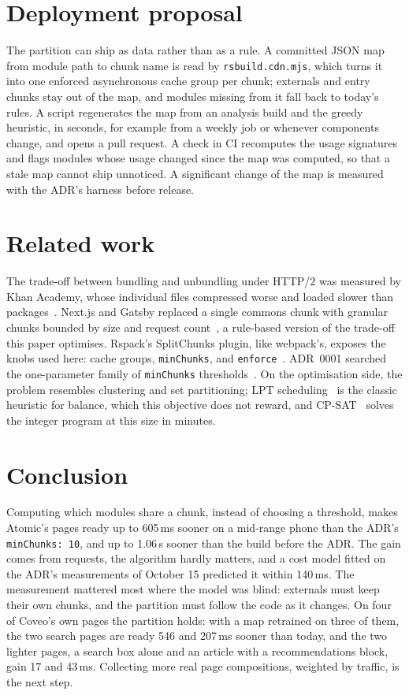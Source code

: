 \documentclass[11pt]{article}
\newcommand{\code}[1]{\texttt{#1}}
\begin{document}
\section{Deployment proposal}\label{sec:deploy}
The partition can ship as data rather than as a rule. A committed JSON map from module path to chunk name is read by \code{rsbuild.cdn.mjs}, which turns it into one enforced asynchronous cache group per chunk; externals and entry chunks stay out of the map, and modules missing from it fall back to today's rules. A script regenerates the map from an analysis build and the greedy heuristic, in seconds, for example from a weekly job or whenever components change, and opens a pull request. A check in CI recomputes the usage signatures and flags modules whose usage changed since the map was computed, so that a stale map cannot ship unnoticed. A significant change of the map is measured with the ADR's harness before release.

\section{Related work}\label{sec:related}
The trade-off between bundling and unbundling under HTTP/2 was measured by Khan Academy, whose individual files compressed worse and loaded slower than packages~\cite{silverstein2015}. Next.js and Gatsby replaced a single commons chunk with granular chunks bounded by size and request count~\cite{djirdeh-granular}, a rule-based version of the trade-off this paper optimises. Rspack's SplitChunks plugin, like webpack's, exposes the knobs used here: cache groups, \code{minChunks}, and \code{enforce}~\cite{rspack-split}. ADR~0001 searched the one-parameter family of \code{minChunks} thresholds~\cite{adr0001}. On the optimisation side, the problem resembles clustering and set partitioning; LPT scheduling~\cite{graham1969} is the classic heuristic for balance, which this objective does not reward, and CP-SAT~\cite{cpsat,cpsatlp} solves the integer program at this size in minutes.

\section{Conclusion}\label{sec:conclusion}
Computing which modules share a chunk, instead of choosing a threshold, makes Atomic's pages ready up to 605\,ms sooner on a mid-range phone than the ADR's \code{minChunks: 10}, and up to 1.06\,s sooner than the build before the ADR. The gain comes from requests, the algorithm hardly matters, and a cost model fitted on the ADR's measurements of October 15 predicted it within 140\,ms. The measurement mattered most where the model was blind: externals must keep their own chunks, and the partition must follow the code as it changes. On four of Coveo's own pages the partition holds: with a map retrained on three of them, the two search pages are ready 546 and 207\,ms sooner than today, and the two lighter pages, a search box alone and an article with a recommendations block, gain 17 and 43\,ms. Collecting more real page compositions, weighted by traffic, is the next step.
\end{document}
